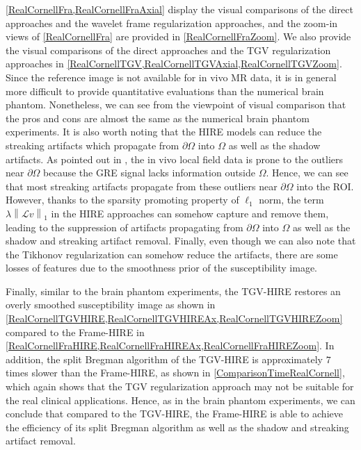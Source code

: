 \documentclass[reqno]{siamonline1116}
\numberwithin{theorem}{section}
\numberwithin{equation}{section}
\def\Om{\Omega}
\def\p{\partial}
\def\msL{{\mathscr L}}
\begin{document}
\cref{RealCornellFra,RealCornellFraAxial} display the visual comparisons of the direct approaches and the wavelet frame regularization approaches, and the zoom-in views of \cref{RealCornellFra} are provided in \cref{RealCornellFraZoom}. We also provide the visual comparisons of the direct approaches and the TGV regularization approaches in \cref{RealCornellTGV,RealCornellTGVAxial,RealCornellTGVZoom}. Since the reference image is not available for in vivo MR data, it is in general more difficult to provide quantitative evaluations than the numerical brain phantom. Nonetheless, we can see from the viewpoint of visual comparison that the pros and cons are almost the same as the numerical brain phantom experiments. It is also worth noting that the HIRE models can reduce the streaking artifacts which propagate from $\p\Om$ into $\Om$ as well as the shadow artifacts. As pointed out in \cite{Y.Wang2015}, the in vivo local field data is prone to the outliers near $\p\Om$ because the GRE signal lacks information outside $\Om$. Hence, we can see that most streaking artifacts propagate from these outliers near $\p\Om$ into the ROI. However, thanks to the sparsity promoting property of $\ell_1$ norm, the term $\lambda\left\|\msL v\right\|_1$ in the HIRE approaches can somehow capture and remove them, leading to the suppression of artifacts propagating from $\p\Om$ into $\Om$ as well as the shadow and streaking artifact removal. Finally, even though we can also note that the Tikhonov regularization can somehow reduce the artifacts, there are some losses of features due to the smoothness prior of the susceptibility image.

Finally, similar to the brain phantom experiments, the TGV-HIRE restores an overly smoothed susceptibility image as shown in \cref{RealCornellTGVHIRE,RealCornellTGVHIREAx,RealCornellTGVHIREZoom} compared to the Frame-HIRE in \cref{RealCornellFraHIRE,RealCornellFraHIREAx,RealCornellFraHIREZoom}. In addition, the split Bregman algorithm of the TGV-HIRE is approximately $7$ times slower than the Frame-HIRE, as shown in \cref{ComparisonTimeRealCornell}, which again shows that the TGV regularization approach may not be suitable for the real clinical applications. Hence, as in the brain phantom experiments, we can conclude that compared to the TGV-HIRE, the Frame-HIRE is able to achieve the efficiency of its split Bregman algorithm as well as the shadow and streaking artifact removal.
\end{document}

